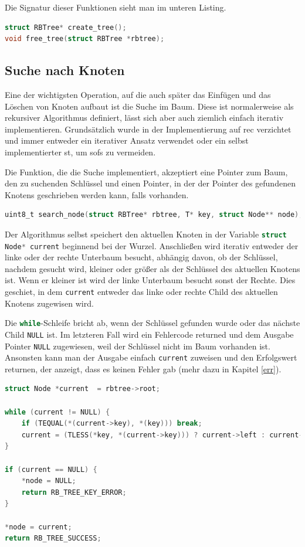 \documentclass[11pt]{article}
\newcommand{\lstin}[1]{\lstinline[language=C]{#1}}
\begin{document}
Die Signatur dieser Funktionen sieht man im unteren Listing.

\begin{lstlisting}[language=C]
struct RBTree* create_tree();
void free_tree(struct RBTree *rbtree);
\end{lstlisting}

\subsection{Suche nach Knoten} \label{sea}
Eine der wichtigsten Operation, auf die auch später das Einfügen und das Löschen von Knoten aufbaut ist die Suche im Baum. Diese ist normalerweise als rekursiver Algorithmus definiert, lässt sich aber auch ziemlich einfach iterativ implementieren.
Grundsätzlich wurde in der Implementierung auf \gls{rec} verzichtet und immer entweder ein iterativer Ansatz verwendet oder ein selbst implementierter \gls{st}, um \glspl{sof} zu vermeiden.

Die Funktion, die die Suche implementiert, akzeptiert eine Pointer zum Baum, den zu suchenden Schlüssel und einen Pointer, in der der Pointer des gefundenen Knotens geschrieben werden kann, falls vorhanden.

\begin{lstlisting}[language=C]
uint8_t search_node(struct RBTree* rbtree, T* key, struct Node** node);
\end{lstlisting}

Der Algorithmus selbst speichert den aktuellen Knoten in der Variable \lstin{struct Node* current} beginnend bei der Wurzel. Anschließen wird iterativ entweder der linke oder der rechte Unterbaum besucht, abhängig davon, ob der Schlüssel, nachdem gesucht wird, kleiner oder größer als der Schlüssel des aktuellen Knotens ist.
Wenn er kleiner ist wird der linke Unterbaum besucht sonst der Rechte. Dies geschiet, in dem \lstin{current} entweder das linke oder rechte Child des aktuellen Knotens zugewisen wird.

Die \lstin{while}-Schleife bricht ab, wenn der Schlüssel gefunden wurde oder das nächste Child \lstin{NULL} ist. Im letzteren Fall wird ein Fehlercode returned und dem Ausgabe Pointer \lstin{NULL} zugewiesen, weil der Schlüssel nicht im Baum vorhanden ist.
Ansonsten kann man der Ausgabe einfach \lstin{current} zuweisen und den Erfolgswert returnen, der anzeigt, dass es keinen Fehler gab (mehr dazu in Kapitel \ref{err}).

\begin{lstlisting}[language=C]
struct Node *current  = rbtree->root;

while (current != NULL) {
    if (TEQUAL(*(current->key), *(key))) break;
    current = (TLESS(*key, *(current->key))) ? current->left : current->right;
}

if (current == NULL) {
    *node = NULL;
    return RB_TREE_KEY_ERROR;
}

*node = current;
return RB_TREE_SUCCESS;
\end{lstlisting}
\end{document}
